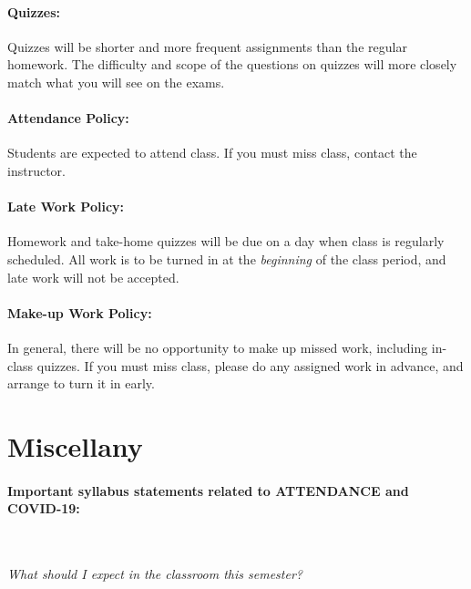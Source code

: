 \documentclass[12pt, letterpaper]{article}
\begin{document}
\paragraph{Quizzes:}
Quizzes will be shorter and more frequent assignments than the regular homework. The difficulty and scope of the questions on quizzes will more closely match what you will see on the exams.

\paragraph{Attendance Policy:}
Students are expected to attend class. If you must miss class, contact the instructor.

\paragraph{Late Work Policy:}
Homework and take-home quizzes will be due on a day when class is regularly scheduled. All work is to be turned in at the \emph{beginning} of the class period, and late work will not be accepted.

\paragraph{Make-up Work Policy:}
In general, there will be no opportunity to make up missed work, including in-class quizzes. If you must miss class, please do any assigned work in advance, and arrange to turn it in early.

\section*{Miscellany}
\paragraph{Important syllabus statements related to ATTENDANCE and COVID-19:} ~

\noindent\emph{What should I expect in the classroom this semester?}
\end{document}
